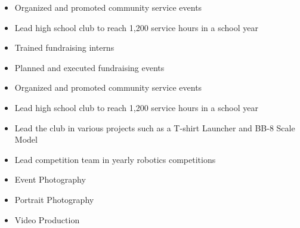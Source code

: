 

\begin{itemize}
\item Organized and promoted community service events 
\smallskip
\item Lead high school club to reach 1,200 service hours in a school year
\smallskip
\end{itemize}

\divider

\begin{itemize}
\item Trained fundraising interns
\smallskip
\item Planned and executed fundraising events
\smallskip
\end{itemize}

\divider

\begin{itemize}
\item Organized and promoted community service events 
\smallskip
\item Lead high school club to reach 1,200 service hours in a school year
\smallskip
\end{itemize}

\divider

\begin{itemize}
\item Lead the club in various projects such as a T-shirt Launcher and BB-8 Scale Model
\smallskip
\item Lead competition team in yearly robotics competitions
\smallskip
\end{itemize}

\begin{itemize}
\item{Event Photography}
\smallskip
\item{Portrait Photography}
\smallskip
\item{Video Production}
\smallskip
\end{itemize}